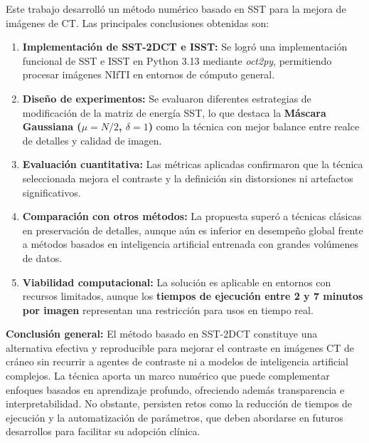 \begin{conclusions}
    Este trabajo desarrolló un método numérico basado en SST para la mejora de imágenes de CT. Las principales conclusiones obtenidas son:

    \begin{enumerate}
        \item \textbf{Implementación de SST-2DCT e ISST:} Se logró una implementación funcional de SST e ISST en Python 3.13 mediante \textit{oct2py}, permitiendo procesar imágenes NIfTI en entornos de cómputo general.

        \item \textbf{Diseño de experimentos:} Se evaluaron diferentes estrategias de modificación de la matriz de energía SST, lo que destaca la \textbf{Máscara Gaussiana ($\mu = N/2$, $\delta = 1$)} como la técnica con mejor balance entre realce de detalles y calidad de imagen.

        \item \textbf{Evaluación cuantitativa:} Las métricas aplicadas confirmaron que la técnica seleccionada mejora el contraste y la definición sin distorsiones ni artefactos significativos.

        \item \textbf{Comparación con otros métodos:} La propuesta superó a técnicas clásicas en preservación de detalles, aunque aún es inferior en desempeño global frente a métodos basados en inteligencia artificial entrenada con grandes volúmenes de datos.

        \item \textbf{Viabilidad computacional:} La solución es aplicable en entornos con recursos limitados, aunque los \textbf{tiempos de ejecución entre 2 y 7 minutos por imagen} representan una restricción para usos en tiempo real.
    \end{enumerate}

    \bigskip

    \textbf{Conclusión general:} El método basado en SST-2DCT constituye una alternativa efectiva y reproducible para mejorar el contraste en imágenes CT de cráneo sin recurrir a agentes de contraste ni a modelos de inteligencia artificial complejos. La técnica aporta un marco numérico que puede complementar enfoques basados en aprendizaje profundo, ofreciendo además transparencia e interpretabilidad. No obstante, persisten retos como la reducción de tiempos de ejecución y la automatización de parámetros, que deben abordarse en futuros desarrollos para facilitar su adopción clínica.
\end{conclusions}

